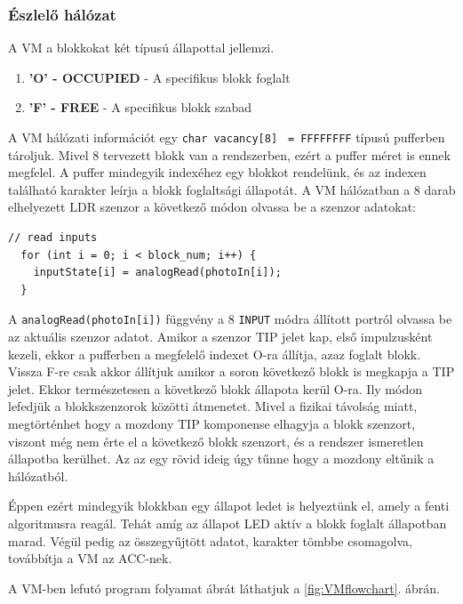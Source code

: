 \documentclass[a4paper,12pt]{article}
\begin{document}
\subsubsection{Észlelő hálózat}
A VM a blokkokat két típusú állapottal jellemzi.
\begin{enumerate}
	\item \textbf{'O' - OCCUPIED} - A specifikus blokk foglalt 
	\item \textbf{'F' - FREE} - A specifikus blokk szabad
\end{enumerate}

A VM hálózati információt egy  \texttt{char vacancy[8]} \texttt{ = FFFFFFFF} típusú pufferben tároljuk. Mivel 8 tervezett blokk van a rendszerben, ezért a puffer méret is ennek megfelel.
A puffer mindegyik indexéhez egy blokkot rendelünk, és az indexen található karakter leírja a blokk foglaltsági állapotát.
A VM hálózatban a 8 darab elhelyezett LDR szenzor a következő módon olvassa be a szenzor adatokat:

\begin{lstlisting}[style=CStyle, caption={LDR adat beolvasása a VM hálózatban},label=code:vm_ldrin]
  // read inputs
  for (int i = 0; i < block_num; i++) {
    inputState[i] = analogRead(photoIn[i]);
  }
\end{lstlisting}

A \texttt{analogRead(photoIn[i])} függvény a 8 \texttt{INPUT} módra állított portról olvassa be az aktuális szenzor adatot.
Amikor a szenzor TIP jelet kap, első impulzusként kezeli, ekkor a pufferben a megfelelő indexet O-ra állítja, azaz foglalt blokk.
Vissza F-re csak akkor állítjuk amikor a soron következő blokk is megkapja a TIP jelet. Ekkor természetesen a következő blokk állapota kerül O-ra.
Ily módon lefedjük a blokkszenzorok közötti átmenetet. 
Mivel a fizikai távolság miatt, megtörténhet hogy a mozdony TIP komponense elhagyja a blokk szenzort, viszont még nem érte el a következő blokk szenzort, és a rendszer ismeretlen állapotba kerülhet.
Az az egy rövid ideig úgy tűnne hogy a mozdony eltűnik a hálózatból.

Éppen ezért mindegyik blokkban egy állapot ledet is helyeztünk el, amely a fenti algoritmusra reagál.
Tehát amíg az állapot LED aktív a blokk foglalt állapotban marad. 
Végül pedig az összegyűjtött adatot, karakter tömbbe csomagolva, továbbítja a VM az ACC-nek.

A VM-ben lefutó program folyamat ábrát láthatjuk a \ref{fig:VMflowchart}. ábrán.
\end{document}
